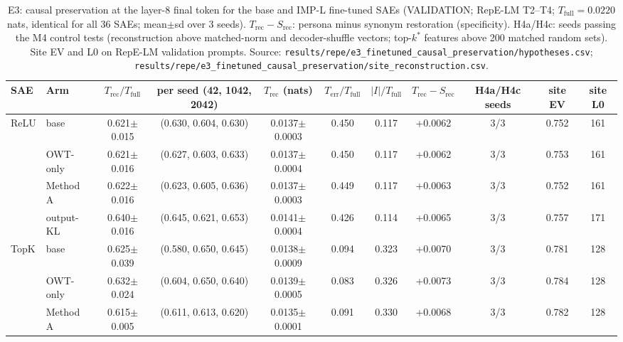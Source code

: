\begin{table}[t]
\centering
\small
\caption{E3: causal preservation at the layer-8 final token for the base and IMP-L fine-tuned SAEs (VALIDATION; RepE-LM T2--T4; $T_{\text{full}}=0.0220$ nats, identical for all 36 SAEs; mean$\pm$sd over 3 seeds). $T_{\text{rec}}-S_{\text{rec}}$: persona minus synonym restoration (specificity). H4a/H4c: seeds passing the M4 control tests (reconstruction above matched-norm and decoder-shuffle vectors; top-$k^\ast$ features above 200 matched random sets). Site EV and L0 on RepE-LM validation prompts. Source: \texttt{results/\allowbreak{}repe/\allowbreak{}e3\_finetuned\_causal\_preservation/\allowbreak{}hypotheses.csv}; \texttt{results/\allowbreak{}repe/\allowbreak{}e3\_finetuned\_causal\_preservation/\allowbreak{}site\_reconstruction.csv}.}
\label{tab:e3}
\begin{adjustbox}{max width=\linewidth}
\begin{tabular}{llccccccccc}
\toprule
SAE & Arm & $T_{\text{rec}}/T_{\text{full}}$ & per seed (42, 1042, 2042) & $T_{\text{rec}}$ (nats) & $T_{\text{err}}/T_{\text{full}}$ & $|I|/T_{\text{full}}$ & $T_{\text{rec}}-S_{\text{rec}}$ & H4a/H4c seeds & site EV & site L0 \\
\midrule
ReLU & base & 0.621$\pm$0.015 & (0.630, 0.604, 0.630) & 0.0137$\pm$0.0003 & 0.450 & 0.117 & +0.0062 & 3/3 & 0.752 & 161 \\
 & OWT-only & 0.621$\pm$0.016 & (0.627, 0.603, 0.633) & 0.0137$\pm$0.0004 & 0.450 & 0.117 & +0.0062 & 3/3 & 0.753 & 161 \\
 & Method A & 0.622$\pm$0.016 & (0.623, 0.605, 0.636) & 0.0137$\pm$0.0003 & 0.449 & 0.117 & +0.0063 & 3/3 & 0.752 & 161 \\
 & output-KL & 0.640$\pm$0.016 & (0.645, 0.621, 0.653) & 0.0141$\pm$0.0004 & 0.426 & 0.114 & +0.0065 & 3/3 & 0.757 & 171 \\
\midrule
TopK & base & 0.625$\pm$0.039 & (0.580, 0.650, 0.645) & 0.0138$\pm$0.0009 & 0.094 & 0.323 & +0.0070 & 3/3 & 0.781 & 128 \\
 & OWT-only & 0.632$\pm$0.024 & (0.604, 0.650, 0.640) & 0.0139$\pm$0.0005 & 0.083 & 0.326 & +0.0073 & 3/3 & 0.784 & 128 \\
 & Method A & 0.615$\pm$0.005 & (0.611, 0.613, 0.620) & 0.0135$\pm$0.0001 & 0.091 & 0.330 & +0.0068 & 3/3 & 0.782 & 128 \\

\end{tabular}
\end{adjustbox}
\end{table}
